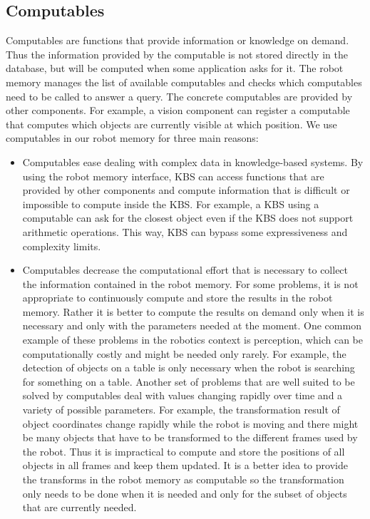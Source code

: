 \subsection{Computables}
\label{sec:computables}
Computables are functions that provide information or knowledge on
demand. Thus the information provided by the computable is not stored
directly in the database, but will be computed when some application
asks for it. The robot memory manages the list of available
computables and checks which computables need to be called to answer a
query. The concrete computables are provided by other components. For
example, a vision component can register a computable that computes
which objects are currently visible at which position. We use
computables in our robot memory for three main reasons:
\begin{itemize}
\item Computables ease dealing with complex data in knowledge-based
  systems. By using the robot memory interface, KBS can access
  functions that are provided by other components and compute
  information that is difficult or impossible to compute inside the
  KBS. For example, a KBS using a computable can ask for the closest
  object even if the KBS does not support arithmetic operations. This
  way, KBS can bypass some expressiveness and complexity limits.

\item Computables decrease the computational effort that is necessary
  to collect the information contained in the robot memory. For some
  problems, it is not appropriate to continuously compute and store
  the results in the robot memory. Rather it is better to compute the
  results on demand only when it is necessary and only with the
  parameters needed at the moment. One common example of these
  problems in the robotics context is perception, which can be
  computationally costly and might be needed only rarely. For example, the
  detection of objects on a table is only necessary when the robot is
  searching for something on a table. Another set of problems that
  are well suited to be solved by computables deal with values
  changing rapidly over time and a variety of possible
  parameters. For example, the transformation result of object
  coordinates change rapidly while the robot is moving and there might
  be many objects that have to be transformed to the different frames
  used by the robot. Thus it is impractical to compute and store the
  positions of all objects in all frames and keep
  them updated. It is a better idea to provide the transforms in the
  robot memory as computable so the transformation only needs to
  be done when it is needed and only for the subset of objects that are
  currently needed.


\end{itemize}
